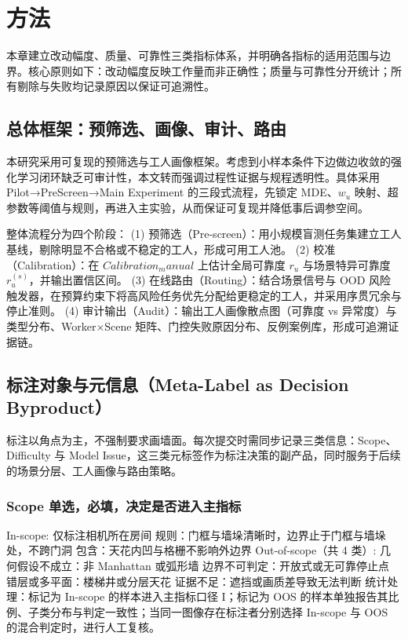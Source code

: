 \documentclass[journal,onecolumn]{IEEEtran}
\begin{document}
\section{方法}

本章建立改动幅度、质量、可靠性三类指标体系，并明确各指标的适用范围与边界。核心原则如下：改动幅度反映工作量而非正确性；质量与可靠性分开统计；所有剔除与失败均记录原因以保证可追溯性。

\subsection{总体框架：预筛选、画像、审计、路由}

本研究采用可复现的预筛选与工人画像框架。考虑到小样本条件下边做边收敛的强化学习闭环缺乏可审计性，本文转而强调过程性证据与规程透明性。具体采用 Pilot→PreScreen→Main Experiment 的三段式流程，先锁定 MDE、$w_u$ 映射、超参数等阈值与规则，再进入主实验，从而保证可复现并降低事后调参空间。

整体流程分为四个阶段：
(1) 预筛选（Pre-screen）：用小规模盲测任务集建立工人基线，剔除明显不合格或不稳定的工人，形成可用工人池。
(2) 校准（Calibration）：在 $Calibration_manual$ 上估计全局可靠度 $r_u$ 与场景特异可靠度 $r_u^{\left(s\right)}$，并输出置信区间。
(3) 在线路由（Routing）：结合场景信号与 OOD 风险触发器，在预算约束下将高风险任务优先分配给更稳定的工人，并采用序贯冗余与停止准则。
(4) 审计输出（Audit）：输出工人画像散点图（可靠度 vs 异常度）与类型分布、Worker×Scene 矩阵、门控失败原因分布、反例案例库，形成可追溯证据链。

\subsection{标注对象与元信息（Meta-Label as Decision Byproduct）}

标注以角点为主，不强制要求画墙面。每次提交时需同步记录三类信息：Scope、Difficulty 与 Model Issue，这三类元标签作为标注决策的副产品，同时服务于后续的场景分层、工人画像与路由策略。
\subsubsection{Scope 单选，必填，决定是否进入主指标}
In-scope: 仅标注相机所在房间
规则：门框与墙垛清晰时，边界止于门框与墙垛处，不跨门洞
包含：天花内凹与格栅不影响外边界
Out-of-scope（共 4 类）:
几何假设不成立：非 Manhattan 或弧形墙
边界不可判定：开放式或无可靠停止点
错层或多平面：楼梯井或分层天花
证据不足：遮挡或画质差导致无法判断
统计处理：标记为 In-scope 的样本进入主指标口径 I；标记为 OOS 的样本单独报告其比例、子类分布与判定一致性；当同一图像存在标注者分别选择 In-scope 与 OOS 的混合判定时，进行人工复核。
\end{document}
